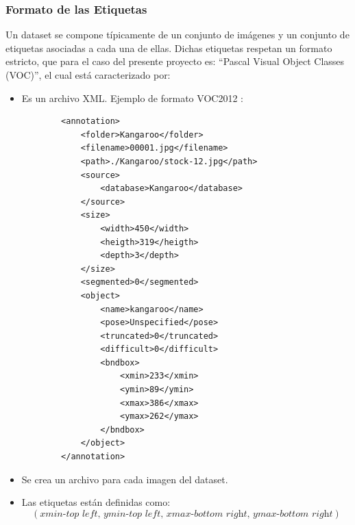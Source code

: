 \newpage
\subsubsection{Formato de las Etiquetas} 
Un dataset se compone típicamente de un conjunto de imágenes y un conjunto de etiquetas asociadas a cada una de ellas. Dichas etiquetas respetan un formato estricto, que para el caso del presente proyecto es: ``Pascal Visual Object Classes (VOC)'', el cual está caracterizado por:

\begin{itemize}
    \item Es un archivo XML. Ejemplo de formato VOC2012 \cite{etiqueta} :
    
        \begin{lstlisting}
        <annotation>
            <folder>Kangaroo</folder>
            <filename>00001.jpg</filename>
            <path>./Kangaroo/stock-12.jpg</path>
            <source>
                <database>Kangaroo</database>
            </source>
            <size>
                <width>450</width>
                <heigth>319</heigth>
                <depth>3</depth>
            </size>
            <segmented>0</segmented>
            <object>
                <name>kangaroo</name>
                <pose>Unspecified</pose>
                <truncated>0</truncated>
                <difficult>0</difficult>
                <bndbox>
                    <xmin>233</xmin>
                    <ymin>89</ymin>
                    <xmax>386</xmax>
                    <ymax>262</ymax>
                </bndbox>
            </object>
        </annotation>
        \end{lstlisting}
    \item Se crea un archivo para cada imagen del dataset.
    \item Las etiquetas están definidas como: \[(\textit{xmin-top left, ymin-top left, xmax-bottom right, ymax-bottom right})\]
\end{itemize}




